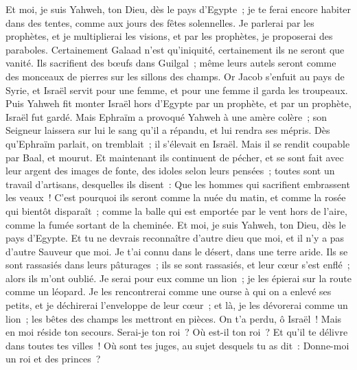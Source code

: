 \begin{multicols}{2}
Et moi, je suis Yahweh, ton Dieu, dès le pays d'Egypte~; je te ferai encore habiter dans des tentes, comme aux jours des fêtes solennelles.
Je parlerai par les prophètes, et je multiplierai les visions, et par les prophètes, je proposerai des paraboles.
Certainement Galaad n'est qu'iniquité, certainement ils ne seront que vanité. Ils sacrifient des bœufs dans Guilgal~; même leurs autels seront comme des monceaux de pierres sur les sillons des champs.
Or Jacob s'enfuit au pays de Syrie, et Israël servit pour une femme, et pour une femme il garda les troupeaux.
Puis Yahweh fit monter Israël hors d'Egypte par un prophète, et par un prophète, Israël fut gardé.
Mais Ephraïm a provoqué Yahweh à une amère colère~; son Seigneur laissera sur lui le sang qu'il a répandu, et lui rendra ses mépris.
\VerseOne{}Dès qu'Ephraïm parlait, on tremblait~; il s'élevait en Israël. Mais il se rendit coupable par Baal, et mourut.
Et maintenant ils continuent de pécher, et se sont fait avec leur argent des images de fonte, des idoles selon leurs pensées~; toutes sont un travail d'artisans, desquelles ils disent~: Que les hommes qui sacrifient embrassent les veaux~!
C'est pourquoi ils seront comme la nuée du matin, et comme la rosée qui bientôt disparaît~; comme la balle qui est emportée par le vent hors de l'aire, comme la fumée sortant de la cheminée.
Et moi, je suis Yahweh, ton Dieu, dès le pays d'Egypte. Et tu ne devrais reconnaître d'autre dieu que moi, et il n'y a pas d'autre Sauveur que moi.
Je t'ai connu dans le désert, dans une terre aride.
Ils se sont rassasiés dans leurs pâturages~; ils se sont rassasiés, et leur cœur s'est enflé~; alors ils m'ont oublié.
Je serai pour eux comme un lion~; je les épierai sur la route comme un léopard.
Je les rencontrerai comme une ourse à qui on a enlevé ses petits, et je déchirerai l'enveloppe de leur cœur~; et là, je les dévorerai comme un lion~; les bêtes des champs les mettront en pièces.
On t'a perdu, ô Israël~! Mais en moi réside ton secours.
Serai-je ton roi~? Où est-il ton roi~? Et qu'il te délivre dans toutes tes villes~! Où sont tes juges, au sujet desquels tu as dit~: Donne-moi un roi et des princes~?

\end{multicols}
